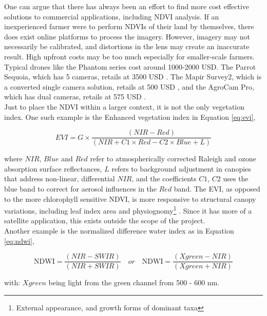 One can argue that there has always been an effort to find more cost effective solutions to commercial applications, including NDVI analysis. If an inexperienced farmer were to perform NDVIs of their land by themselves, there does exist online platforms to process the imagery. However, imagery may not necessarily be calibrated, and distortions in the lens may create an inaccurate result. High upfront costs may be too much especially for smaller-scale farmers. Typical drones like the Phantom series cost around 1000-2000 USD. The Parrot Sequoia, which has 5 cameras, retails at 3500 USD \cite{sequoia}. The Mapir Survey2, which is a converted single camera solution, retails at 500 USD \cite{mapir}, and the AgroCam Pro, which has dual cameras, retails at 575 USD \cite{agrocam}.\\

Just to place the NDVI within a larger context, it is not the only vegetation index. One such example is the Enhanced vegetation index in Equation \ref{eq:evi},

\begin{equation}\label{eq:evi}
EVI=G\times {\frac  {(NIR-Red)}{(NIR+C1\times Red-C2\times Blue+L)}}
\end{equation}

where $NIR$, $Blue$ and $Red$ refer to atmospherically corrected Raleigh and ozone absorption surface reflectances, $L$ refers to background adjustment in canopies that address non-linear, differential $NIR$, and the coefficients $C1$, $C2$ uses the blue band to correct for aerosol influences in the $Red$ band. The EVI, as opposed to the more chlorophyll sensitive NDVI, is more responsive to structural canopy variations, including leaf index area and physiognomy\footnote{External appearance, and growth forms of dominant taxa} \cite{evi}. Since it has more of a satellite application, this exists outside the scope of the project.\\

Another example is the normalized difference water index as in Equation \ref{eq:ndwi},

\begin{equation}\label{eq:ndwi}
{\displaystyle {\mbox{NDWI}}={\frac {(NIR-SWIR)}{(NIR+SWIR)}}}\quad or\quad {\displaystyle {\mbox{NDWI}}={\frac {(Xgreen-NIR)}{(Xgreen+NIR)}}}
\end{equation}

with:
$Xgreen$ being light from the green channel from 500 - 600 nm.\\


